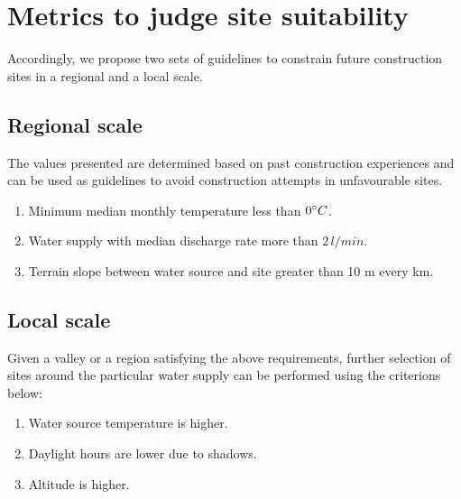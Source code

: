\section{Metrics to judge site suitability}

Accordingly, we propose two sets of guidelines to constrain future construction sites in a regional and a local
scale. 

\subsection{Regional scale}


The values presented are determined based on past construction experiences and can be used as guidelines to
avoid construction attempts in unfavourable sites.

\begin{enumerate}

  \item Minimum median monthly temperature less than $0 ^{\circ} C$. 
  \item Water supply with median discharge rate more than $2\, l/min$.
  \item Terrain slope between water source and site greater than 10 m every km. 

\end{enumerate}

\subsection{Local scale}

Given a valley or a region satisfying the above requirements, further selection of sites around the particular
water supply can be performed using the criterions below: 

\begin{enumerate}
  \item Water source temperature is higher.
  \item Daylight hours are lower due to shadows.
  \item Altitude is higher.
\end{enumerate}





